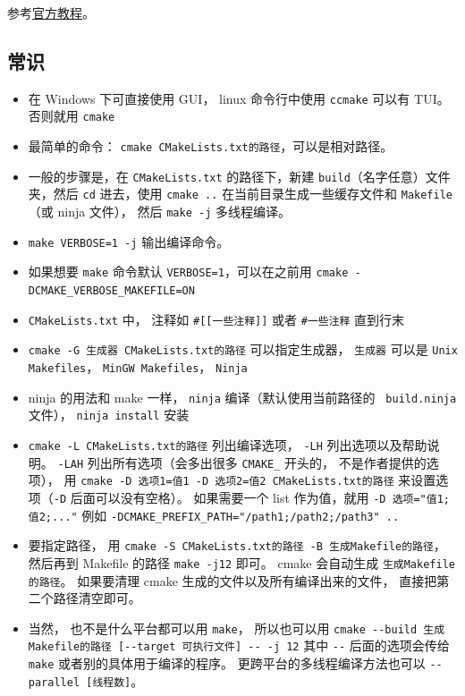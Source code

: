 


参考\href{https://cmake.org/cmake/help/latest/guide/tutorial/index.html}{官方教程}。

\subsection{常识}
\begin{itemize}
\item 在 Windows 下可直接使用 GUI， linux 命令行中使用 \verb`ccmake` 可以有 TUI。 否则就用 \verb`cmake`
\item 最简单的命令： \verb`cmake CMakeLists.txt的路径`，可以是相对路径。 
\item 一般的步骤是，在 \verb`CMakeLists.txt` 的路径下，新建 \verb`build`（名字任意）文件夹，然后 \verb`cd` 进去，使用 \verb`cmake ..` 在当前目录生成一些缓存文件和 \verb`Makefile`（或 ninja 文件）， 然后 \verb`make -j` 多线程编译。
\item \verb`make VERBOSE=1 -j` 输出编译命令。
\item 如果想要 \verb`make` 命令默认 \verb`VERBOSE=1`，可以在之前用 \verb`cmake -DCMAKE_VERBOSE_MAKEFILE=ON`
\item \verb`CMakeLists.txt` 中， 注释如 \verb`#[[一些注释]]` 或者 \verb`#一些注释` 直到行末
\item \verb`cmake -G 生成器 CMakeLists.txt的路径` 可以指定生成器， \verb`生成器` 可以是 \verb`Unix Makefiles`， \verb`MinGW Makefiles`， \verb`Ninja`
\item ninja 的用法和 make 一样， \verb`ninja` 编译（默认使用当前路径的 \verb` build.ninja` 文件）， \verb`ninja install` 安装
\item \verb`cmake -L CMakeLists.txt的路径` 列出编译选项， \verb`-LH` 列出选项以及帮助说明。 \verb`-LAH` 列出所有选项（会多出很多 \verb`CMAKE_` 开头的， 不是作者提供的选项）， 用 \verb`cmake -D 选项1=值1 -D 选项2=值2 CMakeLists.txt的路径` 来设置选项（\verb`-D` 后面可以没有空格）。 如果需要一个 list 作为值，就用 \verb`-D 选项="值1;值2;..."` 例如 \verb`-DCMAKE_PREFIX_PATH="/path1;/path2;/path3" ..`
\item 要指定路径， 用 \verb`cmake -S CMakeLists.txt的路径 -B 生成Makefile的路径`， 然后再到 Makefile 的路径 \verb`make -j12` 即可。 cmake 会自动生成 \verb`生成Makefile的路径`。 如果要清理 cmake 生成的文件以及所有编译出来的文件， 直接把第二个路径清空即可。
\item 当然， 也不是什么平台都可以用 \verb`make`， 所以也可以用 \verb`cmake --build 生成Makefile的路径 [--target 可执行文件] -- -j 12` 其中 \verb`--` 后面的选项会传给 \verb`make` 或者别的具体用于编译的程序。 更跨平台的多线程编译方法也可以 \verb`--parallel [线程数]`。

\end{itemize}
